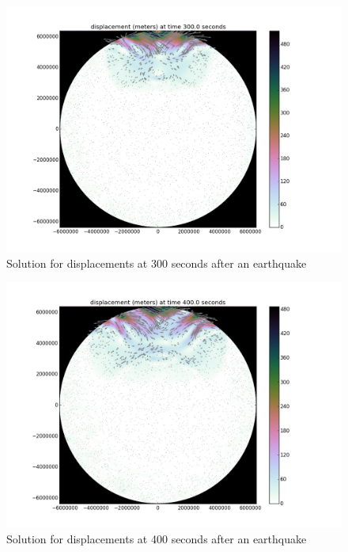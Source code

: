 \documentclass[12pt]{article}
\begin{document}
\begin{figure}
\includegraphics[scale=0.45]{figures/300s}
\centering
\caption{Solution for displacements at 300 seconds after an earthquake}

\end{figure}
\begin{figure}
\includegraphics[scale=0.45]{figures/400s}
\centering
\caption{Solution for displacements at 400 seconds after an earthquake}

\end{figure}
\end{document}
